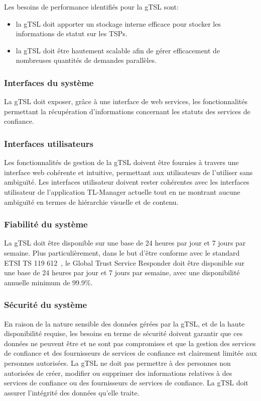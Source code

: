 \documentclass{tnreport}
\begin{document}
Les besoins de performance identifiés pour la gTSL sont:
\begin{itemize}
	\item la gTSL doit apporter un stockage interne efficace pour stocker les informations de statut sur les TSPs.
	\item la gTSL doit être hautement scalable afin de gérer efficacement de nombreuses quantités de demandes parallèles.
\end{itemize}

\subsubsection{Interfaces du système}

La gTSL doit exposer, grâce à une interface de web services, les fonctionnalités permettant la récupération d'informations concernant les statuts des services de confiance.

\subsubsection{Interfaces utilisateurs}

Les fonctionnalités de gestion de la gTSL doivent être fournies à travers une interface web cohérente et intuitive, permettant aux utilisateurs de l'utiliser sans ambiguïté. 
Les interfaces utilisateur doivent rester cohérentes avec les interfaces utilisateur de l'application TL-Manager actuelle tout en ne montrant aucune ambiguïté en termes de hiérarchie visuelle et de contenu.

\subsubsection{Fiabilité du système}

La gTSL doit être disponible sur une base de 24 heures par jour et 7 jours par semaine.
Plus particulièrement, dans le but d'être conforme avec le standard ETSI TS 119 612~\cite{ETSITS119612}, le Global Trust Service Responder doit être disponible sur une base de 24 heures par jour et 7 jours par semaine, avec une disponibilité annuelle minimum de 99.9\%.

\subsubsection{Sécurité du système}

En raison de la nature sensible des données gérées par la gTSL, et de la haute disponibilité requise, les besoins en terme de sécurité doivent garantir que ces données ne peuvent être et ne sont pas compromises et que la gestion des services de confiance et des fournisseurs de services de confiance est clairement limitée aux personnes autorisées.
La gTSL ne doit pas permettre à des personnes non autorisées de créer, modifier ou supprimer des informations relatives à des services de confiance ou des fournisseurs de services de confiance.
La gTSL doit assurer l'intégrité des données qu'elle traite.
\end{document}
